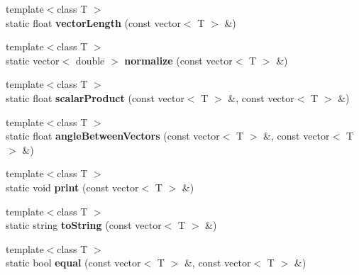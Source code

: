\begin{DoxyCompactItemize}
\item 
\hypertarget{classHelper_ad96cb9aea9e9fe54872f8bdaf2c8cbb6}{
{\footnotesize template$<$class T $>$ }\\static float {\bfseries vectorLength} (const vector$<$ T $>$ \&)}
\label{classHelper_ad96cb9aea9e9fe54872f8bdaf2c8cbb6}

\item 
\hypertarget{classHelper_a42dd358d55e590b453fe3fc96ea3aa6d}{
{\footnotesize template$<$class T $>$ }\\static vector$<$ double $>$ {\bfseries normalize} (const vector$<$ T $>$ \&)}
\label{classHelper_a42dd358d55e590b453fe3fc96ea3aa6d}

\item 
\hypertarget{classHelper_a1f22ff8bf6f897b73f9cac38102e518d}{
{\footnotesize template$<$class T $>$ }\\static float {\bfseries scalarProduct} (const vector$<$ T $>$ \&, const vector$<$ T $>$ \&)}
\label{classHelper_a1f22ff8bf6f897b73f9cac38102e518d}

\item 
\hypertarget{classHelper_a72b8b94e50c314ffc15cfe8b3651e8c9}{
{\footnotesize template$<$class T $>$ }\\static float {\bfseries angleBetweenVectors} (const vector$<$ T $>$ \&, const vector$<$ T $>$ \&)}
\label{classHelper_a72b8b94e50c314ffc15cfe8b3651e8c9}

\item 
\hypertarget{classHelper_a0a07e40d0ba80e78b6f0ce36aec80765}{
{\footnotesize template$<$class T $>$ }\\static void {\bfseries print} (const vector$<$ T $>$ \&)}
\label{classHelper_a0a07e40d0ba80e78b6f0ce36aec80765}

\item 
\hypertarget{classHelper_ab1ec99f89d87d43e810ee35119a08b67}{
{\footnotesize template$<$class T $>$ }\\static string {\bfseries toString} (const vector$<$ T $>$ \&)}
\label{classHelper_ab1ec99f89d87d43e810ee35119a08b67}

\item 
\hypertarget{classHelper_acce1a117e4dc7e6ec245286955a5d41d}{
{\footnotesize template$<$class T $>$ }\\static bool {\bfseries equal} (const vector$<$ T $>$ \&, const vector$<$ T $>$ \&)}
\label{classHelper_acce1a117e4dc7e6ec245286955a5d41d}

\end{DoxyCompactItemize}


